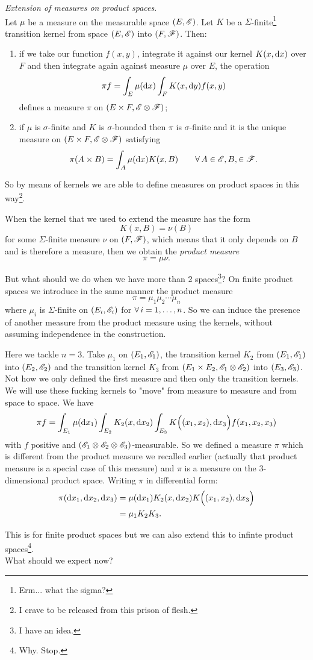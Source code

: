 \documentclass{report}
\begin{document}
\begin{theorem}
	\emph{Extension of measures on product spaces}.\\
	Let $\mu$ be a measure on the measurable space $(E,\mathscr{E})$. Let $K$ be a $\Sigma$-finite\footnote{Erm... what the sigma?} transition kernel from space $(E,\mathscr{E})$ into $(F,\mathscr{F})$. Then:
	\begin{enumerate}[\circnum]
		\item if we take our function $f(x,y)$, integrate it against our kernel $K(x,\mathop{}\!\mathrm{d} x)$ over $F$ and then integrate again against measure $\mu$ over $E$, the operation 
		\[\pi f=\int_E\mu(\mathop{}\!\mathrm{d} x)\int_FK(x,\mathop{}\!\mathrm{d} y)f(x,y)\]
		defines a measure $\pi$ on $(E\times F,\mathscr{E}\otimes\mathscr{F})$;
		\item if $\mu$ is $\sigma$-finite and $K$ is $\sigma$-bounded then $\pi$ is $\sigma$-finite and it is the unique measure on $(E\times F,\mathscr{E}\otimes\mathscr{F})$ satisfying
		\[\pi(A\times B)=\int_A\mu(\mathop{}\!\mathrm{d} x)K(x,B)\qquad\forall\, A\in\mathscr{E},B,\in\mathscr{F}.\]
	\end{enumerate}
\end{theorem}
So by means of kernels we are able to define measures on product spaces in this way\footnote{I crave to be released from this prison of flesh.}.
\begin{remark}
	When the kernel that we used to extend the measure has the form 
	\[K(x,B)=\nu(B)\]
	for some $\Sigma$-finite measure $\nu$ on $(F,\mathscr{F})$, which means that it only depends on $B$ and is therefore a measure, then we obtain the \emph{product measure}
	\[\pi=\mu\nu.\]
\end{remark}
But what should we do when we have more than 2 spaces\footnote{I have an idea.}? On finite product spaces we introduce in the same manner the product measure 
\[\pi=\mu_1\mu_2\cdots\mu_n\]
where $\mu_i$ is $\Sigma$-finite on $(E_i,\mathscr{E}_i)$ for $\forall\, i=1,\ldots,n$.
So we can induce the presence of another measure from the product measure using the kernels, without assuming independence in the construction.
\begin{example}
	Here we tackle $n=3$. Take $\mu_1$ on $(E_1,\mathscr{E}_1)$, the transition kernel $K_2$ from $(E_1,\mathscr{E}_1)$ into $(E_2,\mathscr{E}_2)$ and the transition kernel $K_3$ from $(E_1\times E_2,\mathscr{E}_1\otimes\mathscr{E}_2)$ into $(E_3,\mathscr{E}_3)$. Not how we only defined the first measure and then only the transition kernels. We will use these fucking kernels to "move" from measure to measure and from space to space. We have
	\[\pi f=\int_{E_1}\mu(\mathop{}\!\mathrm{d} x_1)\int_{E_2}K_2(x,\mathop{}\!\mathrm{d} x_2)\int_{E_3}K\Big((x_1,x_2),\mathop{}\!\mathrm{d} x_3\Big)f(x_1,x_2,x_3)\]
	with $f$ positive and $(\mathscr{E}_1\otimes\mathscr{E}_2\otimes\mathscr{E}_3)$-measurable. So we defined a measure $\pi$ which is different from the product measure we recalled earlier (actually that product measure is a special case of this measure) and $\pi$ is a measure on the 3-dimensional product space. Writing $\pi$ in differential form:
	\begin{align*}
		\pi(\mathop{}\!\mathrm{d} x_1,\mathop{}\!\mathrm{d} x_2,\mathop{}\!\mathrm{d} x_3)&=\mu(\mathop{}\!\mathrm{d} x_1)K_2(x,\mathop{}\!\mathrm{d} x_2)K\Big((x_1,x_2),\mathop{}\!\mathrm{d} x_3\Big)\\
		&=\mu_1K_2K_3.
	\end{align*}
\end{example}
This is for finite product spaces but we can also extend this to infinte product spaces\footnote{Why. Stop.}.\\
What should we expect now?
\end{document}
